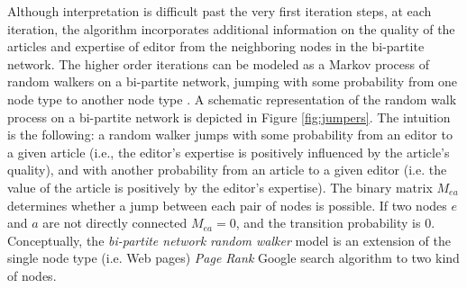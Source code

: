 Although interpretation is difficult past the very first iteration steps, at each iteration, the algorithm incorporates additional information on the quality of the articles and expertise of editor from the neighboring nodes in the bi-partite network. The higher order iterations 
%
%
can be modeled as a Markov process of random walkers on a bi-partite network, jumping with some probability from one node type to another node type \cite{caldarelli2012network}. A schematic representation of the random walk process on a bi-partite network is depicted in Figure \ref{fig:jumpers}. The intuition is the following: a random walker jumps with some probability from an editor to a given article (i.e., the editor's expertise is positively influenced by the article's quality), and with another probability from an article to a given editor (i.e. the value of the article is positively by the editor's expertise). The binary matrix $M_{ea}$ determines whether a jump between each pair of nodes is possible. If two nodes $e$ and $a$ are not directly connected $M_{ea} = 0$, and the transition probability is 0. Conceptually, the {\it bi-partite network random walker} model is an extension of the single node type (i.e. Web pages) {\it Page Rank} Google search algorithm \cite{page1999pagerank,kleinberg1999} to two kind of nodes.

